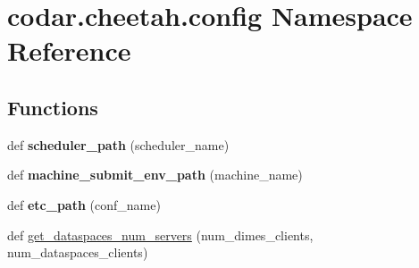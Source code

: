 \hypertarget{namespacecodar_1_1cheetah_1_1config}{}\section{codar.\+cheetah.\+config Namespace Reference}
\label{namespacecodar_1_1cheetah_1_1config}
\subsection*{Functions}
\begin{DoxyCompactItemize}
\item 
\mbox{\label{namespacecodar_1_1cheetah_1_1config_ae1608746b2c45e5199964e986dbc66da}} 
def {\bfseries scheduler\+\_\+path} (scheduler\+\_\+name)
\item 
\mbox{\label{namespacecodar_1_1cheetah_1_1config_a906f4dbe8936921e615b9cc8eae8383f}} 
def {\bfseries machine\+\_\+submit\+\_\+env\+\_\+path} (machine\+\_\+name)
\item 
\mbox{\label{namespacecodar_1_1cheetah_1_1config_a1028977b1cc5dc7f54bd65cb46256c8d}} 
def {\bfseries etc\+\_\+path} (conf\+\_\+name)
\item 
def \hyperlink{namespacecodar_1_1cheetah_1_1config_a777b4339975017c9521b943afd76748d}{get\+\_\+dataspaces\+\_\+num\+\_\+servers} (num\+\_\+dimes\+\_\+clients, num\+\_\+dataspaces\+\_\+clients)
\end{DoxyCompactItemize}
